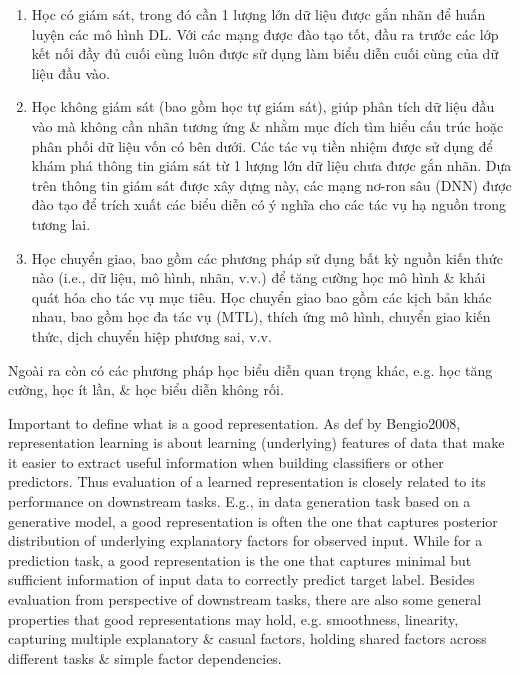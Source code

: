 \documentclass{article}
\begin{document}
\begin{itemize}
\begin{itemize}
        \begin{enumerate}
            \item Học có giám sát, trong đó cần 1 lượng lớn dữ liệu được gắn nhãn để huấn luyện các mô hình DL. Với các mạng được đào tạo tốt, đầu ra trước các lớp kết nối đầy đủ cuối cùng luôn được sử dụng làm biểu diễn cuối cùng của dữ liệu đầu vào.
            \item Học không giám sát (bao gồm học tự giám sát), giúp phân tích dữ liệu đầu vào mà không cần nhãn tương ứng \& nhằm mục đích tìm hiểu cấu trúc hoặc phân phối dữ liệu vốn có bên dưới. Các tác vụ tiền nhiệm được sử dụng để khám phá thông tin giám sát từ 1 lượng lớn dữ liệu chưa được gắn nhãn. Dựa trên thông tin giám sát được xây dựng này, các mạng nơ-ron sâu (DNN) được đào tạo để trích xuất các biểu diễn có ý nghĩa cho các tác vụ hạ nguồn trong tương lai.
            \item Học chuyển giao, bao gồm các phương pháp sử dụng bất kỳ nguồn kiến thức nào (i.e., dữ liệu, mô hình, nhãn, v.v.) để tăng cường học mô hình \& khái quát hóa cho tác vụ mục tiêu. Học chuyển giao bao gồm các kịch bản khác nhau, bao gồm học đa tác vụ (MTL), thích ứng mô hình, chuyển giao kiến thức, dịch chuyển hiệp phương sai, v.v.
        \end{enumerate}
        Ngoài ra còn có các phương pháp học biểu diễn quan trọng khác, e.g. học tăng cường, học ít lần, \& học biểu diễn không rối.

        Important to define what is a good representation. As def by Bengio2008, representation learning is about learning (underlying) features of data that make it easier to extract useful information when building classifiers or other predictors. Thus evaluation of a learned representation is closely related to its performance on downstream tasks. E.g., in data generation task based on a generative model, a good representation is often the one that captures posterior distribution of underlying explanatory factors for observed input. While for a prediction task, a good representation is the one that captures minimal but sufficient information of input data to correctly predict target label. Besides evaluation from perspective of downstream tasks, there are also some general properties that good representations may hold, e.g. smoothness, linearity, capturing multiple explanatory \& casual factors, holding shared factors across different tasks \& simple factor dependencies.


\end{itemize}
\end{itemize}
\end{document}
